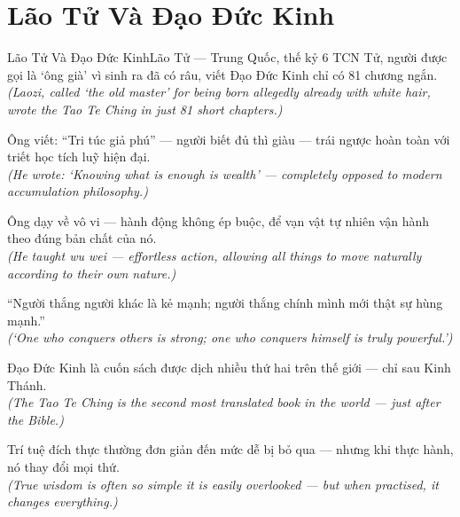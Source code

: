 \section{Lão Tử Và Đạo Đức Kinh}
\begin{truyen}{Lão Tử Và Đạo Đức Kinh}{Lão Tử --- Trung Quốc, thế kỷ 6 TCN}
 Tử, người được gọi là `ông già' vì sinh ra đã có râu, viết Đạo Đức Kinh chỉ có 81 chương ngắn.\\[4pt]
\textit{(Laozi, called `the old master' for being born allegedly already with white hair, wrote the Tao Te Ching in just 81 short chapters.)}

Ông viết: ``Tri túc giả phú'' --- người biết đủ thì giàu --- trái ngược hoàn toàn với triết học tích luỹ hiện đại.\\[4pt]
\textit{(He wrote: `Knowing what is enough is wealth' --- completely opposed to modern accumulation philosophy.)}

Ông dạy về vô vi --- hành động không ép buộc, để vạn vật tự nhiên vận hành theo đúng bản chất của nó.\\[4pt]
\textit{(He taught wu wei --- effortless action, allowing all things to move naturally according to their own nature.)}

``Người thắng người khác là kẻ mạnh; người thắng chính mình mới thật sự hùng mạnh.''\\[4pt]
\textit{(`One who conquers others is strong; one who conquers himself is truly powerful.')}

Đạo Đức Kinh là cuốn sách được dịch nhiều thứ hai trên thế giới --- chỉ sau Kinh Thánh.\\[4pt]
\textit{(The Tao Te Ching is the second most translated book in the world --- just after the Bible.)}

\end{truyen}
\begin{baihoc}
  Trí tuệ đích thực thường đơn giản đến mức dễ bị bỏ qua --- nhưng khi thực hành, nó thay đổi mọi thứ.\\[4pt]
  \textit{(True wisdom is often so simple it is easily overlooked --- but when practised, it changes everything.)}
\end{baihoc}

